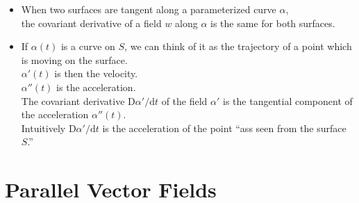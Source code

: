 \documentclass[10pt]{article}
\newcommand{\dee}{\mathrm{d}}
\newcommand{\Dee}{\mathrm{D}}
\begin{document}
\begin{itemize}
    \item When two surfaces are tangent along a parameterized curve $\alpha$,\\
    the covariant derivative of a field $w$ along $\alpha$ is the same for both surfaces.

    \item If $\alpha(t)$ is a curve on $S$, we can think of it as the trajectory of a point which is moving on the surface.\\
    $\alpha'(t)$ is then the velocity.\\
    $\alpha''(t)$ is the acceleration.\\
    The covariant derivative $\Dee \alpha'/ \dee t$ of the field $\alpha'$ is the tangential component of the acceleration $\alpha''(t)$.\\
    Intuitively $\Dee \alpha'/\dee t$ is the acceleration of the point ``ass seen from the surface $S$.''    
  \end{itemize}

  \section{Parallel Vector Fields}
  
\end{document}

